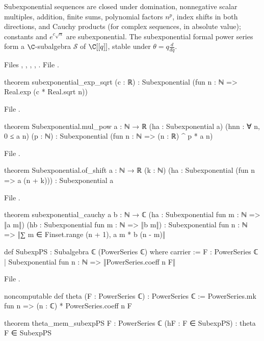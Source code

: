 \begin{theorem}\label{l14:thm:subexpclosure}
Subexponential sequences are closed under domination, nonnegative scalar multiples, addition, finite sums, polynomial factors
$n^p$, index shifts in both directions, and Cauchy products (for complex sequences, in absolute value); constants and
$e^{c\sqrt n}$ are subexponential. The subexponential formal power series form a $\C$-subalgebra $\mathcal S$ of $\C[[q]]$,
stable under $\theta = q\frac{d}{dq}$.
\end{theorem}
\noindent Files , ,
, , . File
.
\begin{leancode}
theorem subexponential_exp_sqrt (c : ℝ) :
    Subexponential (fun n : ℕ => Real.exp (c * Real.sqrt n))
\end{leancode}
\noindent File .
\begin{leancode}
theorem Subexponential.mul_pow {a : ℕ → ℝ} (ha : Subexponential a) (hnn : ∀ n, 0 ≤ a n) (p : ℕ) :
    Subexponential (fun n : ℕ => (n : ℝ) ^ p * a n)
\end{leancode}
\noindent File .
\begin{leancode}
theorem Subexponential.of_shift {a : ℕ → ℝ} (k : ℕ)
    (ha : Subexponential (fun n => a (n + k))) : Subexponential a
\end{leancode}
\noindent File .
\begin{leancode}
theorem subexponential_cauchy {a b : ℕ → ℂ}
    (ha : Subexponential fun m : ℕ => ‖a m‖) (hb : Subexponential fun m : ℕ => ‖b m‖) :
    Subexponential fun n : ℕ => ‖∑ m ∈ Finset.range (n + 1), a m * b (n - m)‖

def SubexpPS : Subalgebra ℂ (PowerSeries ℂ) where
  carrier := {F : PowerSeries ℂ | Subexponential fun n : ℕ => ‖PowerSeries.coeff n F‖}
\end{leancode}
\noindent File .
\begin{leancode}
noncomputable def theta (F : PowerSeries ℂ) : PowerSeries ℂ :=
  PowerSeries.mk fun n => (n : ℂ) * PowerSeries.coeff n F

theorem theta_mem_subexpPS {F : PowerSeries ℂ} (hF : F ∈ SubexpPS) : theta F ∈ SubexpPS
\end{leancode}
